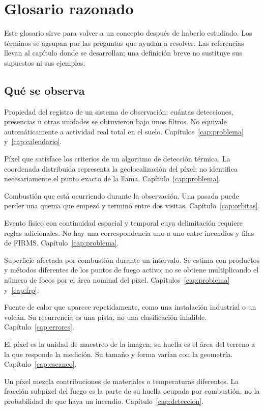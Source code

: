 \chapter{Glosario razonado}\label{ap:glosario}

Este glosario sirve para volver a un concepto después de haberlo estudiado. Los términos se
agrupan por las preguntas que ayudan a resolver. Las referencias llevan al capítulo donde
se desarrollan; una definición breve no sustituye sus supuestos ni sus ejemplos.

\section{Qué se observa}
\begin{description}[style=nextline,leftmargin=1.2em]
\item[Actividad de fuego detectada.] Propiedad del registro de un sistema de observación:
cuántas detecciones, presencias u otras unidades se obtuvieron bajo unos filtros. No equivale
automáticamente a actividad real total en el suelo. Capítulos~\ref{cap:problema} y~\ref{cap:calendario}.
\item[Anomalía térmica o foco de calor.] Píxel que satisface los criterios de un algoritmo
de detección térmica. La coordenada distribuida representa la geolocalización del píxel;
no identifica necesariamente el punto exacto de la llama. Capítulo~\ref{cap:problema}.
\item[Fuego activo.] Combustión que está ocurriendo durante la observación. Una pasada
puede perder una quema que empezó y terminó entre dos visitas. Capítulo~\ref{cap:orbitas}.
\item[Incendio.] Evento físico con continuidad espacial y temporal cuya delimitación
requiere reglas adicionales. No hay una correspondencia uno a uno entre incendios y filas
de FIRMS. Capítulo~\ref{cap:problema}.
\item[Área quemada.] Superficie afectada por combustión durante un intervalo. Se estima
con productos y métodos diferentes de los puntos de fuego activo; no se obtiene multiplicando
el número de focos por el área nominal del píxel. Capítulos~\ref{cap:problema} y~\ref{cap:frp}.
\item[Fuente térmica persistente.] Fuente de calor que aparece repetidamente, como una
instalación industrial o un volcán. Su recurrencia es una pista, no una clasificación
infalible. Capítulo~\ref{cap:errores}.
\item[Píxel y huella.] El píxel es la unidad de muestreo de la imagen; su huella es el
área del terreno a la que responde la medición. Su tamaño y forma varían con la geometría.
Capítulo~\ref{cap:escaneo}.
\item[Píxel mixto y fracción subpíxel.] Un píxel mezcla contribuciones de materiales o
temperaturas diferentes. La fracción subpíxel del fuego es la parte de su huella ocupada
por combustión, no la probabilidad de que haya un incendio. Capítulo~\ref{cap:deteccion}.
\end{description}

